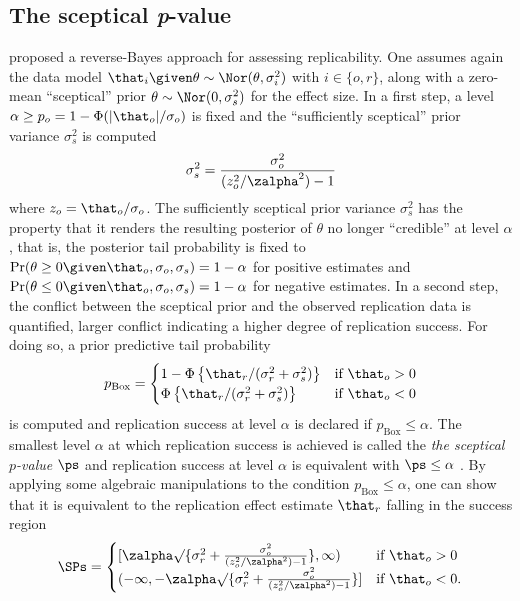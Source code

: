 \begin{subappendices}
\subsection{The sceptical \textit{p}-value}
\citet{Held2020} proposed a reverse-Bayes approach for assessing replicability.
One assumes again the data model
$\that_{i} \given \theta \sim \Nor(\theta, \sigma^{2}_{i})$ with
$i \in \{o, r\}$, along with a zero-mean ``sceptical'' prior
$\theta \sim \Nor(0, \sigma^{2}_{s})$ for the effect size. In a first step, a
level $\alpha \geq p_{o} = 1 - \Phi(|\that_{o}|/\sigma_{o})$ is fixed and the
``sufficiently sceptical'' prior variance $\sigma^{2}_{s}$ is computed
\begin{align*}
  \sigma^{2}_{s} = \frac{\sigma^{2}_{o}}{(z_{o}^{2}/\zalpha^{2}) - 1}
\end{align*}
where $z_{o} = \that_{o}/\sigma_{o}$. The sufficiently sceptical prior variance
$\sigma^{2}_{s}$ has the property that it renders the resulting posterior of
$\theta$ no longer ``credible'' at level $\alpha$, that is, the posterior tail
probability is fixed to
$\Pr(\theta \geq 0 \given \that_{o}, \sigma_{o}, \sigma_{s}) = 1 - \alpha$ for
positive estimates and
$\Pr(\theta \leq 0 \given \that_{o}, \sigma_{o}, \sigma_{s}) = 1 - \alpha$ for
negative estimates. In a second step, the conflict between the sceptical prior
and the observed replication data is quantified, larger conflict indicating a
higher degree of replication success. For doing so, a prior predictive tail
probability
\begin{align*}
  p_{\text{Box}} =
  \begin{cases}
    1 - \Phi\left\{\that_{r}/(\sigma^{2}_{r} + \sigma^{2}_{s})\right\}
    & \text{if} ~ \that_{o} > 0 \\
   \Phi\left\{\that_{r}/(\sigma^{2}_{r} + \sigma^{2}_{s})\right\}
    & \text{if} ~ \that_{o} < 0 \\
    \end{cases}
\end{align*}
is computed and replication success at level $\alpha$ is declared if
$p_{\text{Box}} \leq \alpha$. The smallest level $\alpha$ at which replication
success is achieved is called the \emph{the sceptical $p$-value} $\ps$ and
replication success at level $\alpha$ is equivalent with $\ps \leq \alpha$
\citep[see][for more details on $\ps$]{Held2020, Held2021}. By applying some
algebraic manipulations to the condition $p_{\text{Box}} \leq \alpha$, one can
show that it is equivalent to the replication effect estimate $\that_{r}$
falling in the success region
\begin{align*}
  \SPs =
  \begin{cases}
    [\zalpha \surd\{\sigma^{2}_{r} +
  \frac{\sigma^{2}_{o}}{(z_{o}^{2}/\zalpha^{2}) - 1}\}, \infty)
    & \text{if} ~ \that_{o} > 0 \\
   (-\infty, -\zalpha \surd\{\sigma^{2}_{r} +
  \frac{\sigma^{2}_{o}}{(z_{o}^{2}/\zalpha^{2}) - 1}\}]
    & \text{if} ~ \that_{o} < 0. \\
    \end{cases}
\end{align*}


\end{subappendices}
